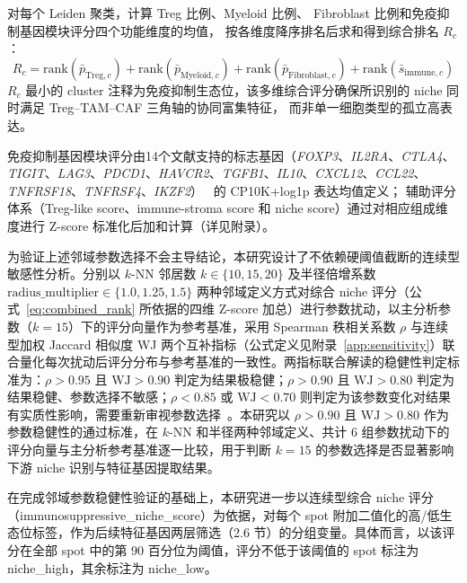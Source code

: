 \documentclass[12pt, a4paper]{ctexart}
\begin{document}
对每个 Leiden 聚类，计算 Treg 比例、Myeloid 比例、
Fibroblast 比例和免疫抑制基因模块评分四个功能维度的均值，
按各维度降序排名后求和得到综合排名 $R_c$：
\begin{equation}
R_c = \text{rank}(\bar{p}_{\text{Treg},c}) + \text{rank}(\bar{p}_{\text{Myeloid},c})
+ \text{rank}(\bar{p}_{\text{Fibroblast},c}) + \text{rank}(\bar{s}_{\text{immune},c})
\label{eq:combined_rank}
\end{equation}
$R_c$ 最小的 cluster 注释为免疫抑制生态位，该多维综合评分确保所识别的 niche 同时满足 Treg--TAM--CAF 三角轴的协同富集特征，
而非单一细胞类型的孤立高表达。

免疫抑制基因模块评分由14个文献支持的标志基因（\textit{FOXP3}、\textit{IL2RA}、\textit{CTLA4}、\textit{TIGIT}、\textit{LAG3}、\textit{PDCD1}、\textit{HAVCR2}、\textit{TGFB1}、\textit{IL10}、\textit{CXCL12}、\textit{CCL22}、\textit{TNFRSF18}、\textit{TNFRSF4}、\textit{IKZF2}）~\citep{sakaguchi2020regulatory,sharma2023immunosuppressive}
的 CP10K+log1p 表达均值定义；
辅助评分体系（Treg-like score、immune-stroma score 和 niche score）通过对相应组成维度进行 Z-score 标准化后加和计算（详见附录）。

为验证上述邻域参数选择不会主导结论，本研究设计了不依赖硬阈值截断的连续型敏感性分析。分别以 $k$-NN 邻居数 $k \in \{10, 15, 20\}$ 及半径倍增系数 $\text{radius\_multiplier} \in \{1.0, 1.25, 1.5\}$ 两种邻域定义方式对综合 niche 评分（公式~\ref{eq:combined_rank} 所依据的四维 Z-score 加总）进行参数扰动，以主分析参数（$k=15$）下的评分向量作为参考基准，采用 Spearman 秩相关系数 $\rho$ 与连续型加权 Jaccard 相似度 WJ 两个互补指标（公式定义见附录~\ref{app:sensitivity}）联合量化每次扰动后评分分布与参考基准的一致性。两指标联合解读的稳健性判定标准为：$\rho > 0.95$ 且 $\text{WJ} > 0.90$ 判定为结果极稳健；$\rho > 0.90$ 且 $\text{WJ} > 0.80$ 判定为结果稳健、参数选择不敏感；$\rho < 0.85$ 或 $\text{WJ} < 0.70$ 则判定为该参数变化对结果有实质性影响，需要重新审视参数选择~\citep{spearman1904proof}。本研究以 $\rho > 0.90$ 且 $\text{WJ} > 0.80$ 作为参数稳健性的通过标准，在 $k$-NN 和半径两种邻域定义、共计 6 组参数扰动下的评分向量与主分析参考基准逐一比较，用于判断 $k=15$ 的参数选择是否显著影响下游 niche 识别与特征基因提取结果。

在完成邻域参数稳健性验证的基础上，本研究进一步以连续型综合 niche 评分（immunosuppressive\_niche\_score）为依据，对每个 spot 附加二值化的高/低生态位标签，作为后续特征基因两层筛选（2.6 节）的分组变量。具体而言，以该评分在全部 spot 中的第 90 百分位为阈值，评分不低于该阈值的 spot 标注为 niche\_high，其余标注为 niche\_low。
\end{document}
